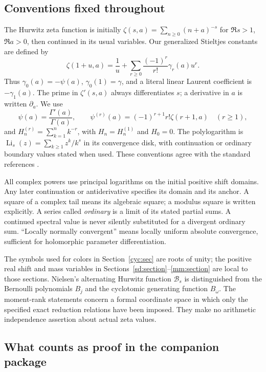 \documentclass[11pt,a4paper]{article}
\numberwithin{equation}{section}
\theoremstyle{definition}
\theoremstyle{remark}
\begin{document}
\subsection{Conventions fixed throughout}

The Hurwitz zeta function is initially
$\zeta(s,a)=\sum_{n\ge0}(n+a)^{-s}$ for $\Re s>1$, $\Re a>0$,
then continued in its usual variables. Our generalized Stieltjes
constants are defined by
\begin{equation}\label{intro:stieltjes}
 \zeta(1+u,a)=\frac1u+
       \sum_{r\ge0}\frac{(-1)^r}{r!}\gamma_r(a)u^r.
\end{equation}
Thus $\gamma_0(a)=-\psi(a)$, $\gamma_0(1)=\gamma$, and a literal
linear Laurent coefficient is $-\gamma_1(a)$.
The prime in $\zeta'(s,a)$ always differentiates $s$; a derivative
in $a$ is written $\partial_a$. We use
\[
 \psi(a)=\frac{\Gamma'(a)}{\Gamma(a)},\qquad
 \psi^{(r)}(a)=(-1)^{r+1}r!\zeta(r+1,a)\quad(r\ge1),
\]
and $H_n^{(r)}=\sum_{k=1}^{n}k^{-r}$, with $H_n=H_n^{(1)}$ and
$H_0=0$. The polylogarithm is
$\operatorname{Li}_s(z)=\sum_{k\ge1}z^k/k^s$ in its convergence
disk, with continuation or ordinary boundary values stated when used.
These conventions agree with the standard references
\cite{DLMFZeta,DLMFPolylog,DLMFPolygamma}.

All complex powers use principal logarithms on the initial positive
shift domains. Any later continuation or antiderivative specifies its
domain and its anchor. A square of a complex tail means its algebraic
square; a modulus square is written explicitly. A series called
\emph{ordinary} is a limit of its stated partial sums. A continued
spectral value is never silently substituted for a divergent ordinary
sum. ``Locally normally convergent'' means locally uniform absolute
convergence, sufficient for holomorphic parameter differentiation.

The symbols used for colors in Section~\ref{cyc:sec} are roots of
unity; the positive real shift and mass variables in
Sections~\ref{sd:section}--\ref{mm:section} are local to those sections.
Nielsen's alternating Hurwitz function $\mathcal B_s$ is distinguished
from the Bernoulli polynomials $B_j$ and the cyclotomic generating
function $B_\omega$. The moment-rank statements concern a formal
coordinate space in which only the specified exact reduction relations
have been imposed. They make no arithmetic independence assertion
about actual zeta values.

\subsection{What counts as proof in the companion package}
\end{document}
